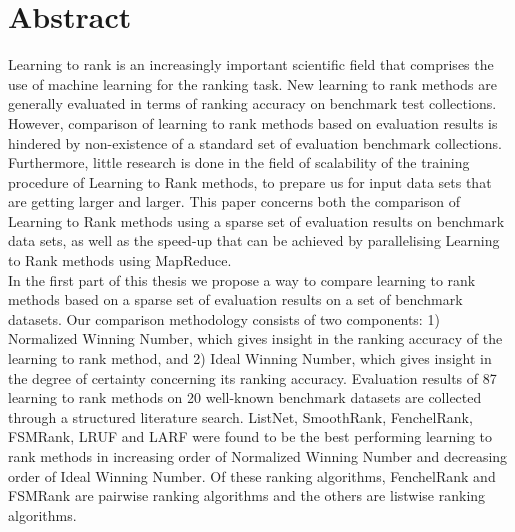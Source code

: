 \begingroup
\let\clearpage\relax
\let\cleardoublepage\relax
\let\cleardoublepage\relax

\chapter*{Abstract}
Learning to rank is an increasingly important scientific field that comprises the use of machine learning for the ranking task. New learning to rank methods are generally evaluated in terms of ranking accuracy on benchmark test collections. However, comparison of learning to rank methods based on evaluation results is hindered by non-existence of a standard set of evaluation benchmark collections. Furthermore, little research is done in the field of scalability of the training procedure of Learning to Rank methods, to prepare us for input data sets that are getting larger and larger. This paper concerns both the comparison of Learning to Rank methods using a sparse set of evaluation results on benchmark data sets, as well as the speed-up that can be achieved by parallelising Learning to Rank methods using MapReduce.\\

In the first part of this thesis we propose a way to compare learning to rank methods based on a sparse set of evaluation results on a set of benchmark datasets. Our comparison methodology consists of two components: 1) Normalized Winning Number, which gives insight in the ranking accuracy of the learning to rank method, and 2) Ideal Winning Number, which gives insight in the degree of certainty concerning its ranking accuracy. Evaluation results of 87 learning to rank methods on 20 well-known benchmark datasets are collected through a structured literature search. ListNet, SmoothRank, FenchelRank, FSMRank, LRUF and LARF were found to be the best performing learning to rank methods in increasing order of Normalized Winning Number and decreasing order of Ideal Winning Number. Of these ranking algorithms, FenchelRank and FSMRank are pairwise ranking algorithms and the others are listwise ranking algorithms.\\

